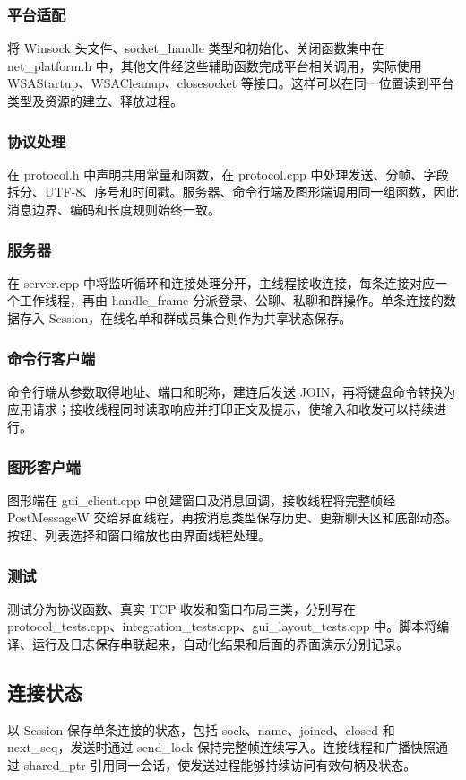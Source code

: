 \documentclass[UTF8,a4paper,10pt,fontset=fandol]{ctexart}
\begin{document}
\subsubsection{平台适配}
将 Winsock 头文件、socket\_handle 类型和初始化、关闭函数集中在 net\_platform.h 中，其他文件经这些辅助函数完成平台相关调用，实际使用 WSAStartup、WSACleanup、closesocket 等接口。这样可以在同一位置读到平台类型及资源的建立、释放过程。

\subsubsection{协议处理}
在 protocol.h 中声明共用常量和函数，在 protocol.cpp 中处理发送、分帧、字段拆分、UTF-8、序号和时间戳。服务器、命令行端及图形端调用同一组函数，因此消息边界、编码和长度规则始终一致。

\subsubsection{服务器}
在 server.cpp 中将监听循环和连接处理分开，主线程接收连接，每条连接对应一个工作线程，再由 handle\_frame 分派登录、公聊、私聊和群操作。单条连接的数据存入 Session，在线名单和群成员集合则作为共享状态保存。

\subsubsection{命令行客户端}
命令行端从参数取得地址、端口和昵称，建连后发送 JOIN，再将键盘命令转换为应用请求；接收线程同时读取响应并打印正文及提示，使输入和收发可以持续进行。

\subsubsection{图形客户端}
图形端在 gui\_client.cpp 中创建窗口及消息回调，接收线程将完整帧经 PostMessageW 交给界面线程，再按消息类型保存历史、更新聊天区和底部动态。按钮、列表选择和窗口缩放也由界面线程处理。

\subsubsection{测试}
测试分为协议函数、真实 TCP 收发和窗口布局三类，分别写在 protocol\_tests.cpp、integration\_tests.cpp、gui\_layout\_tests.cpp 中。脚本将编译、运行及日志保存串联起来，自动化结果和后面的界面演示分别记录。

\subsection{连接状态}
以 Session 保存单条连接的状态，包括 sock、name、joined、closed 和 next\_seq，发送时通过 send\_lock 保持完整帧连续写入。连接线程和广播快照通过 shared\_ptr 引用同一会话，使发送过程能够持续访问有效句柄及状态。
\end{document}
